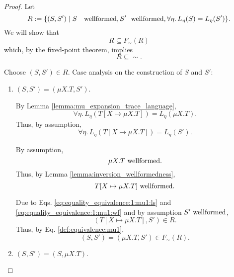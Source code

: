 \documentclass{llncs}
\newcommand*{\sequiv}{\sim}
\newcommand*{\wf}[1]{\text{$#1$ {\normalfont \rmfamily wellformed}}}
\renewcommand*{\|}{\;|\;}
\begin{document}
\begin{proof}
  Let
  \begin{equation*}
    R := \{(S, S') \| \wf{S}, \wf{S'}, \forall \eta.\, L_\eta(S) = L_\eta(S') \}.
  \end{equation*}
  We will show that
  \begin{equation*}
    R \subseteq F_\sequiv(R)
  \end{equation*}
  which, by the fixed-point theorem, implies
  \begin{equation*}
    R \subseteq \sequiv.
  \end{equation*}

  Choose $(S, S') \in R$.
  Case analysis on the construction of $S$ and $S'$:
  \begin{enumerate}
    \item
      \label{case:equality_equivalence:mu1}
      $(S, S') = (\mu X.T, S')$.

      By Lemma \ref{lemma:mu_expansion_trace_language},
      \begin{equation*}
        \forall \eta.\, L_\eta(T[X \mapsto \mu X.T]) = L_\eta(\mu X.T).
      \end{equation*}
      Thus, by assumption,
      \begin{equation}
        \label{eq:equality_equivalence:1:mu1:ls}
        \forall \eta.\, L_\eta(T[X \mapsto \mu X.T]) = L_\eta(S').
      \end{equation}

      By assumption,
      \begin{equation*}
        \wf{\mu X.T}.
      \end{equation*}
      Thus, by Lemma \ref{lemma:inversion_wellformedness},
      \begin{equation}
        \label{eq:equality_equivalence:1:mu1:wf}
        \wf{T[X \mapsto \mu X.T]}.
      \end{equation}

      Due to Eqs. \ref{eq:equality_equivalence:1:mu1:ls} and
      \ref{eq:equality_equivalence:1:mu1:wf} and by assumption
      $\wf{S'}$,
      \begin{equation*}
        (T[X \mapsto \mu X.T], S') \in R.
      \end{equation*}
      Thus, by Eq. \ref{def:equivalence:mu1},
      \begin{equation*}
        (S, S') = (\mu X.T, S') \in F_\sequiv(R).
      \end{equation*}

    \item
      \label{case:equality_equivalence:mu2}
      $(S, S') = (S, \mu X.T)$.


\end{enumerate}
\end{proof}
\end{document}
